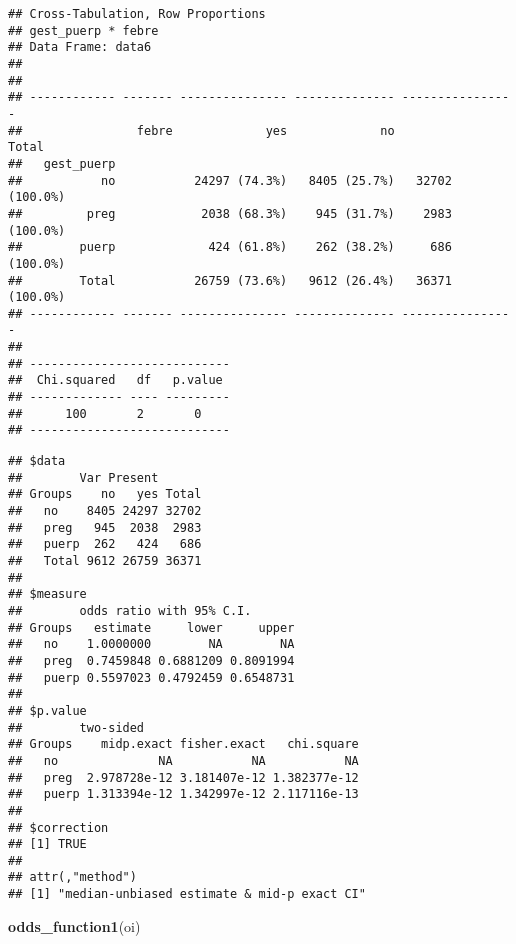\documentclass[
]{article}
\newenvironment{Shaded}{\begin{snugshade}}{\end{snugshade}}
\newcommand{\KeywordTok}[1]{\textcolor[rgb]{0.13,0.29,0.53}{\textbf{#1}}}
\newcommand{\NormalTok}[1]{#1}
\newcommand{\OperatorTok}[1]{\textcolor[rgb]{0.81,0.36,0.00}{\textbf{#1}}}
\newcommand{\StringTok}[1]{\textcolor[rgb]{0.31,0.60,0.02}{#1}}
\begin{document}
\begin{verbatim}
## Cross-Tabulation, Row Proportions  
## gest_puerp * febre  
## Data Frame: data6  
## 
## 
## ------------ ------- --------------- -------------- ----------------
##                febre             yes             no            Total
##   gest_puerp                                                        
##           no           24297 (74.3%)   8405 (25.7%)   32702 (100.0%)
##         preg            2038 (68.3%)    945 (31.7%)    2983 (100.0%)
##        puerp             424 (61.8%)    262 (38.2%)     686 (100.0%)
##        Total           26759 (73.6%)   9612 (26.4%)   36371 (100.0%)
## ------------ ------- --------------- -------------- ----------------
## 
## ----------------------------
##  Chi.squared   df   p.value 
## ------------- ---- ---------
##      100       2       0    
## ----------------------------
\end{verbatim}

\begin{Shaded}
\end{Shaded}

\begin{verbatim}
## $data
##        Var Present
## Groups    no   yes Total
##   no    8405 24297 32702
##   preg   945  2038  2983
##   puerp  262   424   686
##   Total 9612 26759 36371
## 
## $measure
##        odds ratio with 95% C.I.
## Groups   estimate     lower     upper
##   no    1.0000000        NA        NA
##   preg  0.7459848 0.6881209 0.8091994
##   puerp 0.5597023 0.4792459 0.6548731
## 
## $p.value
##        two-sided
## Groups    midp.exact fisher.exact   chi.square
##   no              NA           NA           NA
##   preg  2.978728e-12 3.181407e-12 1.382377e-12
##   puerp 1.313394e-12 1.342997e-12 2.117116e-13
## 
## $correction
## [1] TRUE
## 
## attr(,"method")
## [1] "median-unbiased estimate & mid-p exact CI"
\end{verbatim}

\begin{Shaded}
\begin{Highlighting}[]
\KeywordTok{odds_function1}\NormalTok{(oi)}
\end{Highlighting}
\end{Shaded}
\end{document}
